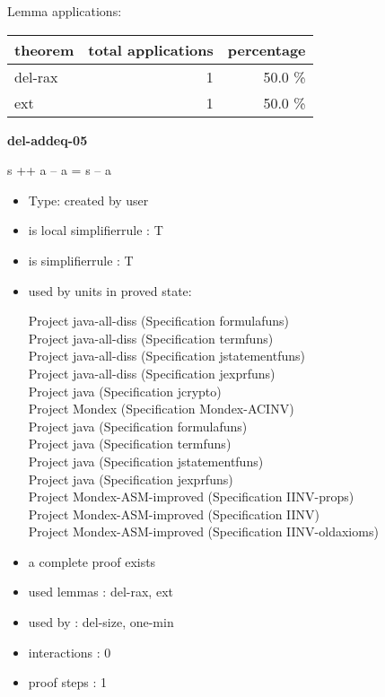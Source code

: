 \documentclass[a4paper]{article}
\begin{document}
Lemma applications:

\begin{supertabular}{l|r|r}
theorem	        & total applications & percentage \\ \hline
del-rax & 1 & 50.0 \% \\
ext & 1 & 50.0 \% \\

\end{supertabular}
\pagebreak

{\LARGE\bf del-addeq-05}\label{lemma-del-addeq-05}

\medskip

 \Fol s ++ a -- a = s -- a

\begin{itemize}

\item Type: created by user

\item is local simplifierrule : T
\item is simplifierrule : T
\item used by units in proved state:

Project java-all-diss (Specification formulafuns) \\
Project java-all-diss (Specification termfuns) \\
Project java-all-diss (Specification jstatementfuns) \\
Project java-all-diss (Specification jexprfuns) \\
Project java (Specification jcrypto) \\
Project Mondex (Specification Mondex-ACINV) \\
Project java (Specification formulafuns) \\
Project java (Specification termfuns) \\
Project java (Specification jstatementfuns) \\
Project java (Specification jexprfuns) \\
Project Mondex-ASM-improved (Specification IINV-props) \\
Project Mondex-ASM-improved (Specification IINV) \\
Project Mondex-ASM-improved (Specification IINV-oldaxioms)
\item       a complete proof exists
\item       used lemmas  : del-rax, ext
\item       used by      : del-size, one-min
\item       interactions : 0
\item       proof steps  : 1
\end{itemize}
\end{document}
